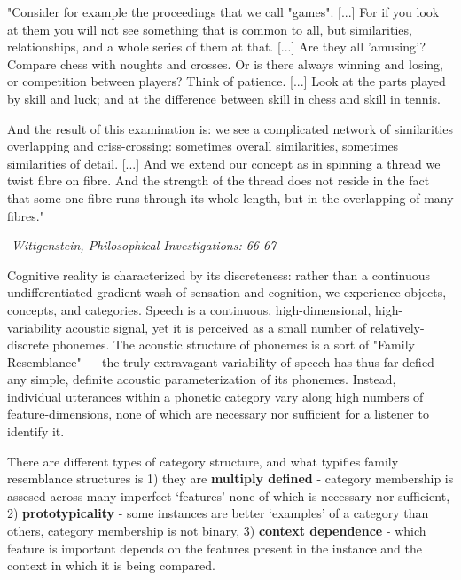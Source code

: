 
\begin{leftbar}

"Consider for example the proceedings that we call "games". [...] For if you look at them you will not see something that is common to all, but similarities, relationships, and a whole series of them at that. [...] Are they all 'amusing'? Compare chess with noughts and crosses. Or is there always winning and losing, or competition between players? Think of patience. [...] Look at the parts played by skill and luck; and at the difference between skill in chess and skill in tennis. 

And the result of this examination is: we see a complicated network
of similarities overlapping and criss-crossing: sometimes overall similarities, sometimes similarities of detail. [...] And we extend our concept as in spinning a thread we twist fibre on fibre. And the strength of the thread does not reside in the fact that some one fibre runs through its whole length, but in the overlapping of many fibres."

\textit{-Wittgenstein, Philosophical Investigations: 66-67\citep{wittgensteinPhilosophicalInvestigations1968}}

\end{leftbar}

Cognitive reality is characterized by its discreteness: rather than a continuous undifferentiated gradient wash of sensation and cognition, we experience objects, concepts, and categories. Speech is a continuous, high-dimensional, high-variability acoustic signal, yet it is perceived as a small number of relatively-discrete phonemes\citep{holtSpeechPerceptionCategorization2010}. The acoustic structure of phonemes is a sort of "Family Resemblance"\citep{wittgensteinPhilosophicalInvestigations1968} --- the truly extravagant variability of speech has thus far defied any simple, definite acoustic parameterization of its phonemes. Instead, individual utterances within a phonetic category vary along high numbers of feature-dimensions, none of which are necessary nor sufficient for a listener to identify it\citep{Lisker1977,Bailey1980}.

There are different types of category structure, and what typifies family resemblance structures is 1) they are \textbf{multiply defined} - category membership is assesed across many imperfect `features' none of which is necessary nor sufficient, 2) \textbf{prototypicality} - some instances are better `examples' of a category than others, category membership is not binary, 3) \textbf{context dependence} - which feature is important depends on the features present in the instance and the context in which it is being compared. \citep{roschFamilyResemblancesStudies1975}

